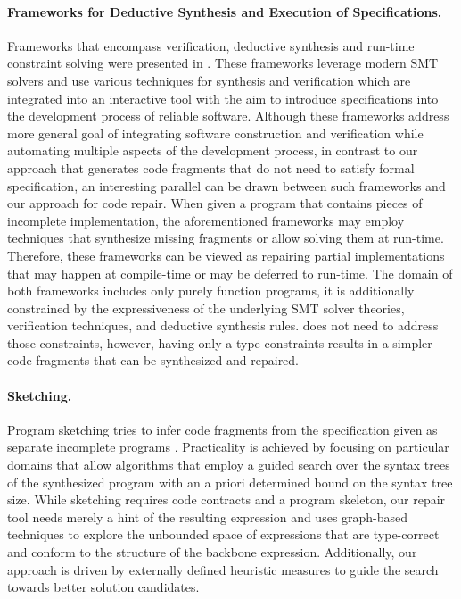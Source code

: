 \paragraph{{\bf Frameworks for Deductive Synthesis and Execution of
Specifications.}} Frameworks that encompass verification, deductive
synthesis and run-time constraint solving were presented in
\cite{KuncakETAL13ExecutingSpecificationsSynthesisConstraintSolvingInvitedTalk,
KneussETAL13SynthesisModuloRecursiveFunctions}. These frameworks leverage modern SMT solvers
and use various techniques for
synthesis and verification which are integrated into an interactive tool with
 the aim to introduce specifications into the development process of reliable
 software.
Although these frameworks address more general goal of integrating software construction
and verification while automating multiple aspects of the development process,
in contrast to our approach that generates code fragments that do not need
to satisfy formal specification, an interesting parallel can be drawn between
such frameworks and our approach for code repair.
When given a program that contains pieces of incomplete implementation, the
aforementioned frameworks may employ techniques that synthesize missing
fragments or allow solving them at run-time.
Therefore, these frameworks can be viewed as repairing partial implementations
that may happen at compile-time or may be deferred to run-time.
The domain of both  frameworks includes only purely function programs, it is additionally
constrained by the expressiveness of the underlying SMT solver theories, verification
techniques, and deductive synthesis rules. \ourTool does not need to address those constraints, however, having only a type constraints results in a simpler code fragments that can be synthesized and repaired.

\paragraph{{\bf Sketching.}}
Program sketching tries to infer code fragments from the specification
given as separate incomplete programs
\cite{Solar-Lezama:2007:SS:1250734.1250754,Solar-Lezama:2006:CSF:1168919.1168907}.
Practicality is achieved by focusing on particular domains that allow algorithms
that employ a guided search over the syntax trees of the synthesized program with an a priori
determined bound on the syntax tree size.
While sketching requires code contracts and a program skeleton, our repair tool
 needs merely a hint of the resulting
expression and uses graph-based techniques to explore the unbounded space of expressions
that are type-correct and conform to the structure of the backbone expression.
Additionally, our approach is driven by externally defined
heuristic measures to guide the search towards better solution candidates.

